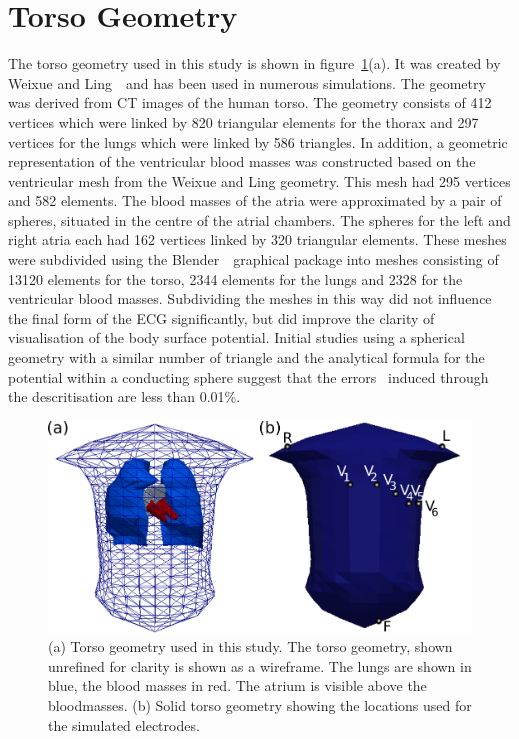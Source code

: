 \section{Torso Geometry}

The torso geometry used in this study is shown in figure~\ref{fig:bsp:torso}(a).
It was created by Weixue and Ling~\cite{Weixue1993,Weixue1996}\ and has been
used in numerous simulations.
The geometry was derived from CT images of the human torso.
The geometry consists of 412 vertices which were linked by 820 triangular
elements for the thorax and 297 vertices for the lungs which were linked
by 586 triangles.
In addition, a geometric representation of the ventricular blood masses was
constructed based on the ventricular mesh from the Weixue and Ling geometry.
This mesh had 295 vertices and 582 elements.
The blood masses of the atria were approximated by a pair of spheres, situated
in the centre of the atrial chambers.
The spheres for the left and right atria each had 162 vertices linked by 320
triangular elements.
These meshes were subdivided using the Blender~\cite{Blender}\ graphical package
into meshes consisting of 13120 elements for the torso, 2344 elements for the
lungs and 2328 for the ventricular blood masses.
Subdividing the meshes in this way did not influence the final form of the ECG
significantly, but did improve the clarity of visualisation of the body surface
potential.
Initial studies using a spherical geometry with a similar number of triangle and
the analytical formula for the potential within a conducting sphere suggest that
the errors~\cite{Ferguson1997} induced through the descritisation are less
than 0.01\%.

\begin{figure}
\includegraphics{figures/bsp/thorax_layout}
\caption[Torso showing embedded atrium and lead locations]{
\label{fig:bsp:torso}
(a) Torso geometry used in this study.
The torso geometry, shown unrefined for clarity is shown as a wireframe.
The lungs are shown in blue, the blood masses in red.
The atrium is visible above the bloodmasses.
(b) Solid torso geometry showing the locations used for the simulated
electrodes.
}
\end{figure}

